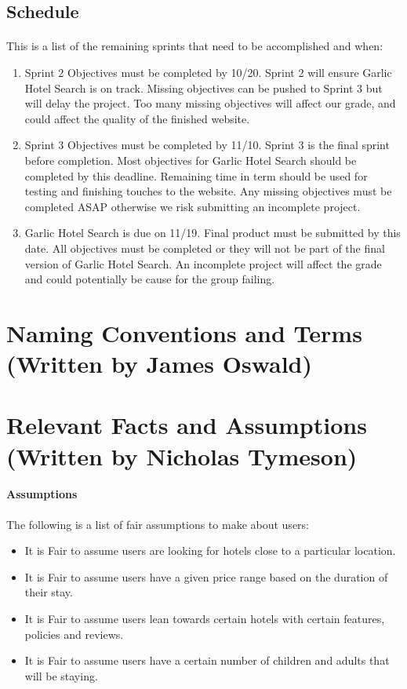 \documentclass[]{article}
\begin{document}
\subsection{Schedule}
\paragraph{}
This is a list of the remaining sprints that need to be accomplished and when:

\begin{enumerate}
    \item Sprint 2 Objectives must be completed by 10/20. Sprint 2 will ensure Garlic Hotel Search is on track. Missing objectives can be pushed to Sprint 3 but will delay the project. Too many missing objectives will affect our grade, and could affect the quality of the finished website. 
    \item Sprint 3 Objectives must be completed by 11/10. Sprint 3 is the final sprint before completion. Most objectives for Garlic Hotel Search should be completed by this deadline. Remaining time in term should be used for testing and finishing touches to the website. Any missing objectives must be completed ASAP otherwise we risk submitting an incomplete project.
    \item Garlic Hotel Search is due on 11/19. Final product must be submitted by this date. All objectives must be completed or they will not be part of the final version of Garlic Hotel Search. An incomplete project will affect the grade and could potentially be cause for the group failing.
\end{enumerate}

\section{Naming Conventions and Terms\\ (Written by James Oswald)}

\section{Relevant Facts and Assumptions\\ (Written by Nicholas Tymeson)}
\paragraph{Assumptions}
The following is a list of fair assumptions to make about users:
\begin{itemize}
    \item It is Fair to assume users are looking for hotels close to a particular location.
    \item It is Fair to assume users have a given price range based on the duration of their stay.
    \item It is Fair to assume users lean towards certain hotels with certain features, policies and reviews.
    \item It is Fair to assume users have a certain number of children and adults that will be staying.
\end{itemize}
  
\end{document}
